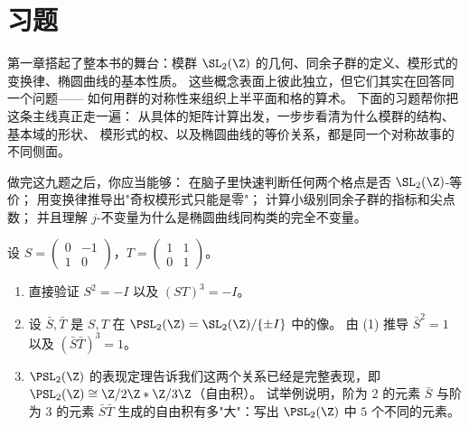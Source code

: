 \section{习题}
\label{sec:ch1-exercises}

第一章搭起了整本书的舞台：模群 $\SL_2(\Z)$ 的几何、同余子群的定义、模形式的变换律、椭圆曲线的基本性质。
这些概念表面上彼此独立，但它们其实在回答同一个问题——
如何用群的对称性来组织上半平面和格的算术。
下面的习题帮你把这条主线真正走一遍：
从具体的矩阵计算出发，一步步看清为什么模群的结构、基本域的形状、
模形式的权、以及椭圆曲线的等价关系，都是同一个对称故事的不同侧面。

做完这九题之后，你应当能够：
在脑子里快速判断任何两个格点是否 $\SL_2(\Z)$-等价；
用变换律推导出"奇权模形式只能是零"；
计算小级别同余子群的指标和尖点数；
并且理解 $j$-不变量为什么是椭圆曲线同构类的完全不变量。

\begin{exercise}
\label{ex:ch1-sl2z-generators}
设 $S = \begin{pmatrix}0 & -1 \\ 1 & 0\end{pmatrix}$，$T = \begin{pmatrix}1 & 1 \\ 0 & 1\end{pmatrix}$。
\begin{enumerate}
  \item[(1)] 直接验证 $S^2 = -I$ 以及 $(ST)^3 = -I$。
  \item[(2)] 设 $\bar{S}, \bar{T}$ 是 $S, T$ 在 $\PSL_2(\Z) = \SL_2(\Z)/\{\pm I\}$ 中的像。
    由 (1) 推导 $\bar{S}^2 = 1$ 以及 $(\bar{S}\bar{T})^3 = 1$。
  \item[(3)] $\PSL_2(\Z)$ 的表现定理告诉我们这两个关系已经是完整表现，即
    $\PSL_2(\Z) \cong \Z/2\Z * \Z/3\Z$（自由积）。
    试举例说明，阶为 $2$ 的元素 $\bar{S}$ 与阶为 $3$ 的元素 $\bar{S}\bar{T}$
    生成的自由积有多"大"：写出 $\PSL_2(\Z)$ 中 $5$ 个不同的元素。
\end{enumerate}
\end{exercise}

